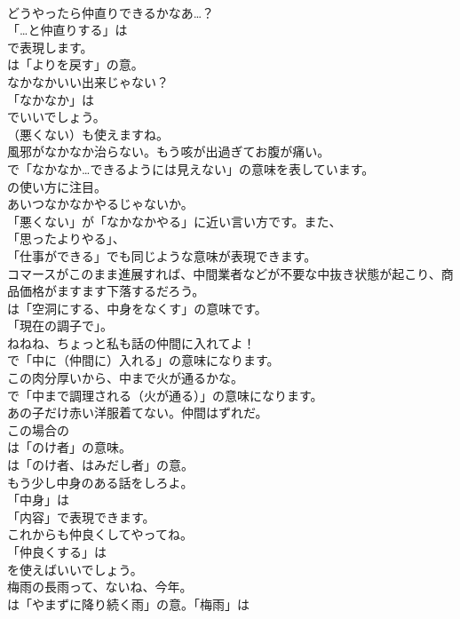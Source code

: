 \documentclass[8pt]{extreport}
\begin{document}
\begin{CJK}{UTF8}{min}
\\	どうやったら仲直りできるかなあ…？ 
\\	「…と仲直りする」は 
\\	で表現します。
\\	は「よりを戻す」の意。	
\\	なかなかいい出来じゃない？ 
\\	「なかなか」は
\\	でいいでしょう。
\\	（悪くない）も使えますね。	
\\	風邪がなかなか治らない。もう咳が出過ぎてお腹が痛い。 
\\	で「なかなか…できるようには見えない」の意味を表しています。
\\	の使い方に注目。	
\\	あいつなかなかやるじゃないか。 
\\	「悪くない」が「なかなかやる」に近い言い方です。また、
\\	「思ったよりやる」、
\\	「仕事ができる」でも同じような意味が表現できます。	
\\	コマースがこのまま進展すれば、中間業者などが不要な中抜き状態が起こり、商品価格がますます下落するだろう。 
\\	は「空洞にする、中身をなくす」の意味です。
\\	「現在の調子で」。	
\\	ねねね、ちょっと私も話の仲間に入れてよ！ 
\\	で「中に（仲間に）入れる」の意味になります。	
\\	この肉分厚いから、中まで火が通るかな。 
\\	で「中まで調理される（火が通る）」の意味になります。	
\\	あの子だけ赤い洋服着てない。仲間はずれだ。 
\\	この場合の 
\\	は「のけ者」の意味。
\\	は「のけ者、はみだし者」の意。	
\\	もう少し中身のある話をしろよ。 
\\	「中身」は
\\	「内容」で表現できます。	
\\	これからも仲良くしてやってね。 
\\	「仲良くする」は
\\	を使えばいいでしょう。	
\\	梅雨の長雨って、ないね、今年。 
\\	は「やまずに降り続く雨」の意。「梅雨」は

\end{CJK}
\end{document}
